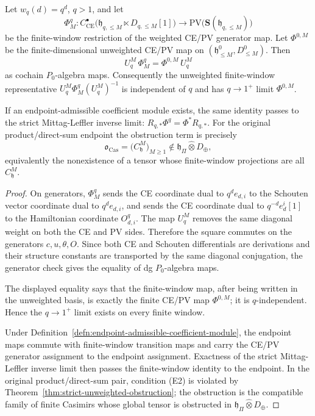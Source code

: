 \begin{thm}
\label{thm:wt-ce-pv-qtoone-stabilization}
  Let \(w_q(d)=q^d\), \(q>1\), and let
  \[
    \Phi^q_M\colon
    C^\bullet_{\mathrm{CE}}
      \bigl(\mathfrak h_{q,\leq M}\ltimes D_{q,\leq M}[1]\bigr)
    \longrightarrow
    \mathrm{PV}\bigl(\mathbf S(\mathfrak h_{q,\leq M})\bigr)
  \]
  be the finite-window restriction of the weighted CE/PV generator map.
  Let \(\Phi^{0,M}\) be the finite-dimensional unweighted CE/PV map on
  \((\mathfrak h^0_{\leq M},D^0_{\leq M})\).  Then
  \[
    U^M_q\,\Phi^q_M=\Phi^{0,M}\,U^M_q
  \]
  as cochain \(P_0\)-algebra maps.  Consequently the unweighted
  finite-window representative \(U^M_q\Phi^q_M(U^M_q)^{-1}\) is
  independent of \(q\) and has \(q\to1^+\) limit \(\Phi^{0,M}\).

  If an endpoint-admissible coefficient module exists, the same
  identity passes to the strict Mittag-Leffler inverse limit:
  \(R_{q,\ast}\Phi^q=\Phi^\ast R_{q,\ast}\).  For the original
  product/direct-sum endpoint the obstruction term is precisely
  \[
    \mathfrak o_{\mathrm{Cas}}
      =\bigl(C^M_{\mathfrak h}\bigr)_{M\geq1}
      \notin
      \mathfrak h_\Pi\widehat\otimes D_\oplus ,
  \]
  equivalently the nonexistence of a tensor whose finite-window
  projections are all \(C^M_{\mathfrak h}\).
\end{thm}

\begin{proof}
  On generators, \(\Phi^q_M\) sends the CE coordinate dual to
  \(q^de_{d,i}\) to the Schouten vector coordinate dual to
  \(q^de_{d,i}\), and sends the CE coordinate dual to
  \(q^{-d}e_d^i[1]\) to the Hamiltonian coordinate
  \(O_{d,i}^{q}\).  The map \(U^M_q\) removes the same diagonal weight
  on both the CE and PV sides.  Therefore the square commutes on the
  generators \(c,u,\theta,O\).  Since both CE and Schouten
  differentials are derivations and their structure constants are
  transported by the same diagonal conjugation, the generator check
  gives the equality of dg \(P_0\)-algebra maps.

	  The displayed equality says that the finite-window map, after being
	  written in the unweighted basis, is exactly the finite CE/PV map
	  \(\Phi^{0,M}\); it is \(q\)-independent.  Hence the
  \(q\to1^+\) limit exists on every finite window.

  Under Definition~\ref{defn:endpoint-admissible-coefficient-module},
  the endpoint maps commute with finite-window transition maps and
  carry the CE/PV generator assignment to the endpoint assignment.
  Exactness of the strict Mittag-Leffler inverse limit then passes the
  finite-window identity to the endpoint.  In the original
	  product/direct-sum pair, condition (E2) is violated by
	  Theorem~\ref{thm:strict-unweighted-obstruction}; the obstruction is
	  the compatible family of finite Casimirs whose global tensor is obstructed in
	  \(\mathfrak h_\Pi\widehat\otimes D_\oplus\).
\end{proof}

